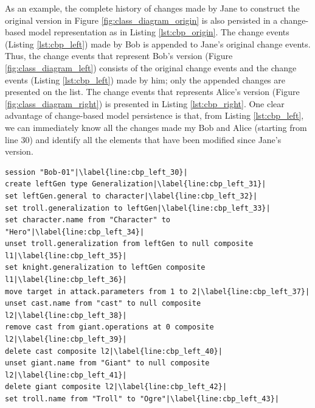 As an example, the complete history of changes made by Jane to construct the original version in Figure \ref{fig:class_diagram_origin} is also persisted in a change-based model representation as in Listing \ref{lst:cbp_origin}. The change events (Listing \ref{lst:cbp_left}) made by Bob is appended to Jane's original change events. Thus, the change events that represent Bob's version (Figure \ref{fig:class_diagram_left}) consists of the original change events and the change events (Listing \ref{lst:cbp_left}) made by him; only the appended changes are presented on the list. The change events that represents Alice's version (Figure \ref{fig:class_diagram_right}) is presented in Listing \ref{lst:cbp_right}. One clear advantage of change-based model persistence is that, from Listing \ref{lst:cbp_left}, we can immediately know all the changes made my Bob and Alice (starting from line 30) and identify all the elements that have been modified since Jane's version.  

\vspace{-20pt}
\begin{lstlisting}[firstnumber=30,style=eol,escapechar=|,caption={The appended events made by Bob to produce the left version in Figure \ref{fig:class_diagram_left} (left version).},label=lst:cbp_left]
session "Bob-01"|\label{line:cbp_left_30}|
create leftGen type Generalization|\label{line:cbp_left_31}|
set leftGen.general to character|\label{line:cbp_left_32}|
set troll.generalization to leftGen|\label{line:cbp_left_33}|
set character.name from "Character" to "Hero"|\label{line:cbp_left_34}|
unset troll.generalization from leftGen to null composite l1|\label{line:cbp_left_35}|
set knight.generalization to leftGen composite l1|\label{line:cbp_left_36}|
move target in attack.parameters from 1 to 2|\label{line:cbp_left_37}|
unset cast.name from "cast" to null composite l2|\label{line:cbp_left_38}|
remove cast from giant.operations at 0 composite l2|\label{line:cbp_left_39}|
delete cast composite l2|\label{line:cbp_left_40}|
unset giant.name from "Giant" to null composite l2|\label{line:cbp_left_41}|
delete giant composite l2|\label{line:cbp_left_42}|
set troll.name from "Troll" to "Ogre"|\label{line:cbp_left_43}|
\end{lstlisting}

